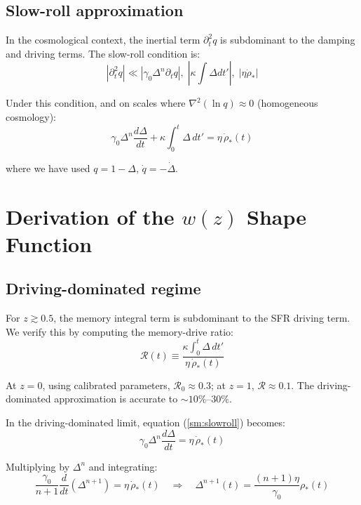 \documentclass[12pt,a4paper]{article}
\begin{document}
\subsection{Slow-roll approximation}

In the cosmological context, the inertial term $\partial_t^2 q$ is subdominant to the damping and driving terms. The slow-roll condition is:
\begin{equation}
|\partial_t^2 q| \ll |\gamma_0\Delta^n\partial_t q|,\; |\kappa\!\int\!\Delta dt'|,\; |\eta\dot{\rho}_*|
\end{equation}

Under this condition, and on scales where $\nabla^2(\ln q)\approx0$ (homogeneous cosmology):
\begin{equation}\label{sm:slowroll}
\boxed{\gamma_0\Delta^n\frac{d\Delta}{dt} + \kappa\int_0^t\Delta\,dt' = \eta\,\dot{\rho}_*(t)}
\end{equation}

where we have used $q=1-\Delta$, $\dot{q}=-\dot{\Delta}$.

\section{Derivation of the $w(z)$ Shape Function}

\subsection{Driving-dominated regime}

For $z\gtrsim0.5$, the memory integral term is subdominant to the SFR driving term. We verify this by computing the memory-drive ratio:
\begin{equation}
\mathcal{R}(t)\equiv\frac{\kappa\int_0^t\Delta\,dt'}{\eta\,\dot{\rho}_*(t)}
\end{equation}

At $z=0$, using calibrated parameters, $\mathcal{R}_0\approx0.3$; at $z=1$, $\mathcal{R}\approx0.1$. The driving-dominated approximation is accurate to $\sim10\%$--$30\%$.

In the driving-dominated limit, equation (\ref{sm:slowroll}) becomes:
\begin{equation}
\gamma_0\Delta^n\frac{d\Delta}{dt} = \eta\,\dot{\rho}_*(t)
\end{equation}

Multiplying by $\Delta^n$ and integrating:
\begin{equation}
\frac{\gamma_0}{n+1}\frac{d}{dt}(\Delta^{n+1}) = \eta\,\dot{\rho}_*(t) \quad\Rightarrow\quad \Delta^{n+1}(t) = \frac{(n+1)\eta}{\gamma_0}\rho_*(t)
\end{equation}
\end{document}
